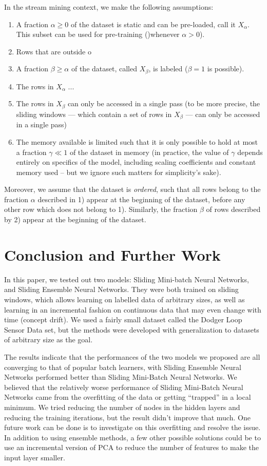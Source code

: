 \documentclass[conference]{IEEEtran}
\begin{document}
		In the stream mining context, we make the following assumptions:
		\begin{enumerate}
			\item A fraction $\alpha \geq 0$ of the dataset is static and can be pre-loaded, call it $X_\alpha$. This subset can be used for pre-training ()whenever $\alpha > 0$).
			\item Rows that are outside o
			\item A fraction $\beta \geq \alpha$ of the dataset, called $X_\beta$, is labeled ($\beta = 1$ is possible).
			\item The rows in $X_\alpha$ ...
			\item The rows in $X_\beta$ can only be accessed in a single pass (to be more precise, the sliding windows --- which contain a set of rows in $X_\beta$ --- can only be accessed in a single pass)
			\item The memory available is limited such that it is only possible to hold at most a fraction $\gamma \ll 1$ of the dataset in memory (in practice, the value of $\gamma$ depends entirely on
			specifics of the model, including scaling coefficients and constant memory used -- but we ignore such matters for simplicity's sake).
		\end{enumerate}
		Moreover, we assume that the dataset is \emph{ordered}, such that all rows belong to the fraction $\alpha$ described in 1) appear at the beginning of the dataset, before any other row which does not belong to 1). Similarly, the fraction $\beta$ of rows described by 2) appear at the beginning of the dataset.
		
		
		\section{Conclusion and Further Work}
		\label{sec:conclusion}
		
		In this paper, we tested out two models: Sliding Mini-batch Neural Networks,  and Sliding Ensemble Neural Networks. They were both trained on sliding windows, which allows learning on labelled data of arbitrary sizes, as well as learning in an incremental fashion on continuous data that may even change with time (concept drift). We used a fairly small dataset called the Dodger Loop Sensor Data set, but the methods were developed with generalization to datasets of arbitrary size as the goal.
		
		The results indicate that the performances of the two models we proposed are all converging to that of popular batch learners, with Sliding Ensemble Neural Networks performed better than Sliding Mini-Batch Neural Networks. We believed that the relatively worse performance of  Sliding Mini-Batch Neural Networks came from the overfitting of the data or getting ``trapped'' in a local minimum. We tried reducing the number of nodes in the hidden layers and reducing the training iterations, but the result didn't improve that much. One future work can be done is to investigate on this overfitting and resolve the issue. In addition to using ensemble methods, a few other possible solutions could be to use an incremental version of PCA to reduce the number of features to make the input layer smaller.
		
\end{document}
